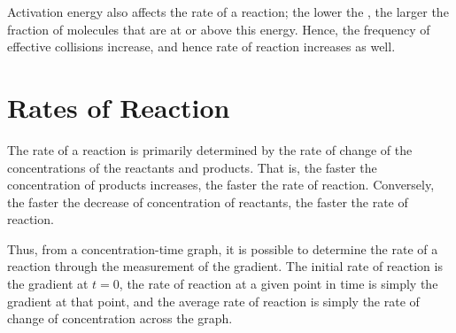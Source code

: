 			Activation energy also affects the rate of a reaction; the lower the \ea, the larger the fraction of molecules that are at or above
			this energy. Hence, the frequency of effective collisions increase, and hence rate of reaction increases as well.



	\section{Rates of Reaction}

		The rate of a reaction is primarily determined by the rate of change of the concentrations of the reactants and products. That is,
		the faster the concentration of products increases, the faster the rate of reaction. Conversely, the faster the decrease of
		concentration of reactants, the faster the rate of reaction.

		\begin{center}
		\end{center}

		Thus, from a concentration-time graph, it is possible to determine the rate of a reaction through the measurement of the gradient.
		The initial rate of reaction is the gradient at $t = 0$, the rate of reaction at a given point in time is simply the gradient at that
		point, and the average rate of reaction is simply the rate of change of concentration across the graph.


